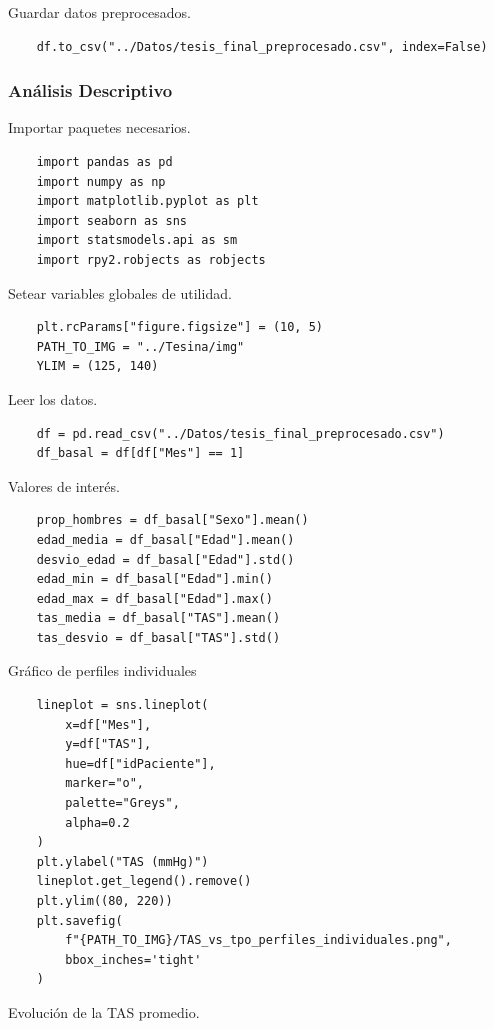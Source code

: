 \documentclass[spanish]{article}
\numberwithin{figure}{subsection}
\numberwithin{equation}{subsection}
\numberwithin{table}{subsection}
\begin{document}
Guardar datos preprocesados.

\begin{lstlisting}
	df.to_csv("../Datos/tesis_final_preprocesado.csv", index=False)
\end{lstlisting}

\subsubsection{Análisis Descriptivo}

Importar paquetes necesarios.

\begin{lstlisting}
	import pandas as pd
	import numpy as np
	import matplotlib.pyplot as plt
	import seaborn as sns
	import statsmodels.api as sm
	import rpy2.robjects as robjects
\end{lstlisting}

Setear variables globales de utilidad.

\begin{lstlisting}
	plt.rcParams["figure.figsize"] = (10, 5)
	PATH_TO_IMG = "../Tesina/img"
	YLIM = (125, 140)
\end{lstlisting}

Leer los datos.

\begin{lstlisting}
	df = pd.read_csv("../Datos/tesis_final_preprocesado.csv")
	df_basal = df[df["Mes"] == 1]
\end{lstlisting}

Valores de interés.

\begin{lstlisting}
	prop_hombres = df_basal["Sexo"].mean()
	edad_media = df_basal["Edad"].mean()
	desvio_edad = df_basal["Edad"].std()
	edad_min = df_basal["Edad"].min()
	edad_max = df_basal["Edad"].max()
	tas_media = df_basal["TAS"].mean()
	tas_desvio = df_basal["TAS"].std()
\end{lstlisting}

Gráfico de perfiles individuales

\begin{lstlisting}
	lineplot = sns.lineplot(
		x=df["Mes"],
		y=df["TAS"],
		hue=df["idPaciente"],
		marker="o",
		palette="Greys",
		alpha=0.2
	)
	plt.ylabel("TAS (mmHg)")
	lineplot.get_legend().remove()
	plt.ylim((80, 220))
	plt.savefig(
		f"{PATH_TO_IMG}/TAS_vs_tpo_perfiles_individuales.png",
		bbox_inches='tight'
	)
\end{lstlisting}

Evolución de la TAS promedio.
\end{document}
